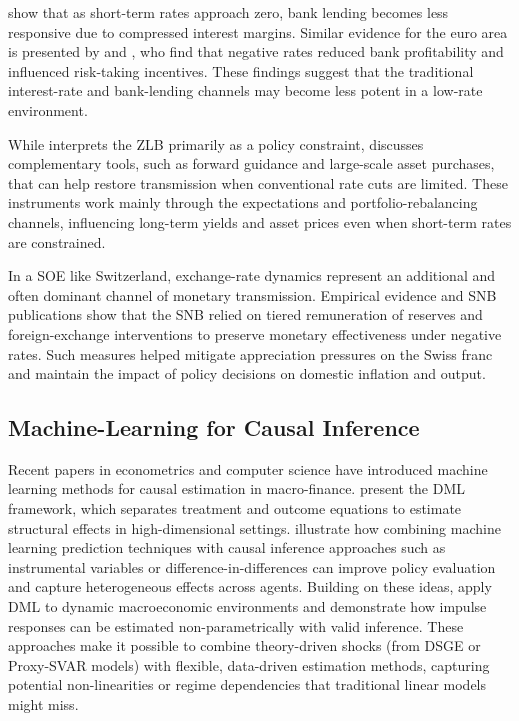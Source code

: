 \documentclass[12pt,a4paper]{article}
\begin{document}
\citet{borio2017} show that as short-term rates approach zero, bank lending becomes less responsive due to compressed interest margins. Similar evidence for the euro area is presented by \citet{inhoffen2021} and \citet{europeanparliament2021}, who find that negative rates reduced bank profitability and influenced risk-taking incentives. These findings suggest that the traditional interest-rate and bank-lending channels may become less potent in a low-rate environment.

While \citet{rogoff2017} interprets the ZLB primarily as a policy constraint, \citet{woodford2012} discusses complementary tools, such as forward guidance and large-scale asset purchases, that can help restore transmission when conventional rate cuts are limited. These instruments work mainly through the expectations and portfolio-rebalancing channels, influencing long-term yields and asset prices even when short-term rates are constrained.

In a SOE like Switzerland, exchange-rate dynamics represent an additional and often dominant channel of monetary transmission. Empirical evidence and SNB publications \citep{snb2019, baumann2025} show that the SNB relied on tiered remuneration of reserves and foreign-exchange interventions to preserve monetary effectiveness under negative rates. Such measures helped mitigate appreciation pressures on the Swiss franc and maintain the impact of policy decisions on domestic inflation and output.

\subsection{Machine-Learning for Causal Inference}
Recent papers in econometrics and computer science have introduced machine learning methods for causal estimation in macro-finance.  
\citet{chernozhukov2018} present the DML framework, which separates treatment and outcome equations to estimate structural effects in high-dimensional settings.  
\citet{athey2017} illustrate how combining machine learning prediction techniques with causal inference approaches such as instrumental variables or difference-in-differences can improve policy evaluation and capture heterogeneous effects across agents.  
Building on these ideas, \citet{ballinari2024} apply DML to dynamic macroeconomic environments and demonstrate how impulse responses can be estimated non-parametrically with valid inference. These approaches make it possible to combine theory-driven shocks (from DSGE or Proxy-SVAR models) with flexible, data-driven estimation methods, capturing potential non-linearities or regime dependencies that traditional linear models might miss.  
\end{document}
